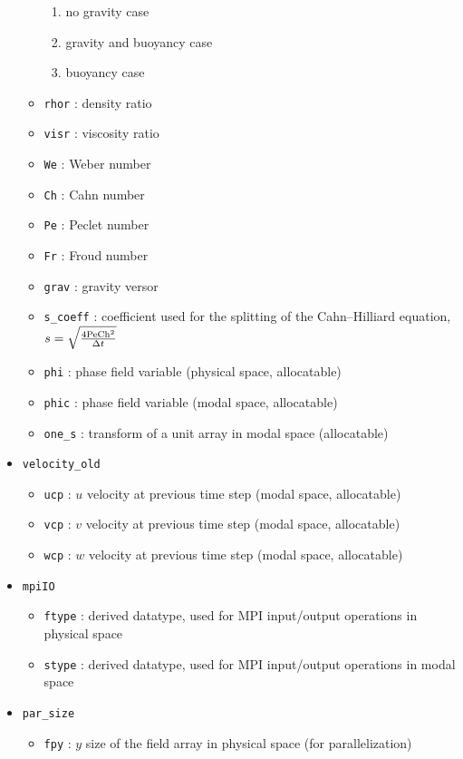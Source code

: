 \begin{itemize}
\begin{itemize}
\begin{enumerate}
\item no gravity case
\item gravity and buoyancy case
\item buoyancy case
\end{enumerate}
\item \texttt{rhor} : density ratio
\item \texttt{visr}  : viscosity ratio
\item \texttt{We} : Weber number
\item \texttt{Ch} : Cahn number
\item \texttt{Pe} : Peclet number
\item \texttt{Fr} : Froud number
\item \texttt{grav} : gravity versor
\item \texttt{s\_coeff} : coefficient used for the splitting of the Cahn--Hilliard equation, $s=\sqrt{\frac{4\textnormal{Pe}\textnormal{Ch}^2}{\Delta t}}$
\item \texttt{phi} : phase field variable (physical space, allocatable)
\item \texttt{phic} : phase field variable (modal space, allocatable)
\item \texttt{one\_s} : transform of a unit array in modal space (allocatable)
\end{itemize}
\item \texttt{velocity\_old}
\begin{itemize}
\item \texttt{ucp} : $u$ velocity at previous time step (modal space, allocatable)
\item \texttt{vcp} : $v$ velocity at previous time step (modal space, allocatable)
\item \texttt{wcp} : $w$ velocity at previous time step (modal space, allocatable)
\end{itemize}
\item \texttt{mpiIO}
\begin{itemize}
\item \texttt{ftype} : derived datatype, used for MPI input/output operations in physical space
\item \texttt{stype} : derived datatype, used for MPI input/output operations in modal space
\end{itemize}
\item \texttt{par\_size}
\begin{itemize}
\item \texttt{fpy} : $y$ size of the field array in physical space (for parallelization)

\end{itemize}
\end{itemize}
